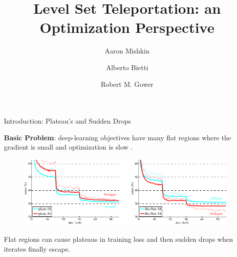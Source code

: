 \documentclass[usenames,dvipsnames,mathserif,notheorems]{beamer}
\title{Level Set Teleportation: an Optimization Perspective}
\author{Aaron Mishkin \and Alberto Bietti \and Robert M. Gower}
\date{}
\newcommand{\bad}[1]{\textcolor{bad}{#1}}
\newcommand{\good}[1]{\textcolor{good}{#1}}
\begin{document}
\maketitle

\begin{frame}{Introduction: Plateau's and Sudden Drops}

    \textbf{Basic Problem}: deep-learning objectives have many \bad{flat regions}
    where the gradient is small and optimization is slow \citep{fukumizu2000local}.

    \pause

    \begin{figure}[]
        \centering
        \includegraphics[width=0.98\textwidth]{assets/plateau.png}
    \end{figure}

    \pause

    Flat regions can cause \bad{plateaus} in training loss and then \good{sudden
        drops} when iterates finally escape.


\end{frame}
\end{document}
